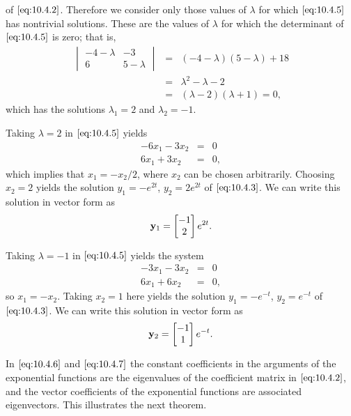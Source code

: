 \documentclass{ximera}
\begin{document}
of $\eqref{eq:10.4.2}$. Therefore we consider only those values of $\lambda$
for which $\eqref{eq:10.4.5}$ has nontrivial solutions. These are the values
of $\lambda$ for which the determinant of $\eqref{eq:10.4.5}$ is zero;   that
is,
\begin{eqnarray*}
\begin{vmatrix}-4-\lambda&-3\\6&5-\lambda\end{vmatrix}&=&
(-4-\lambda)(5-\lambda)+18\\&=&\lambda^2-\lambda-2\\
&=&(\lambda-2)(\lambda+1)=0,
\end{eqnarray*}
which has the solutions $\lambda_1=2$ and $\lambda_2=-1$.

Taking $\lambda=2$ in  $\eqref{eq:10.4.5}$ yields
\begin{eqnarray*}
-6 x_1-3 x_2&=&0\\
6 x_1+3 x_2&=&0,
\end{eqnarray*}
which implies that $x_1=-x_2/2$, where  $x_2$ can be
chosen arbitrarily. Choosing
$x_2=2$ yields the solution $y_1=-e^{2t}$,
$y_2=2e^{2t}$ of  $\eqref{eq:10.4.3}$. We can write this solution in vector
form as
\begin{equation}\label{eq:10.4.6}
{\bf y}_1=\begin{bmatrix} -1\\2\end{bmatrix} e^{2t}.
\end{equation}

Taking $\lambda=-1$ in  $\eqref{eq:10.4.5}$ yields the system
\begin{eqnarray*}
-3 x_1-3 x_2&=&0\\
6 x_1+6 x_2&=&0,
\end{eqnarray*}
so $x_1=-x_2$. Taking $x_2=1$ here
yields the solution $y_1=-e^{-t}$, $y_2=e^{-t}$ of  $\eqref{eq:10.4.3}$. We
can write this solution in vector form as
\begin{equation}\label{eq:10.4.7}
{\bf y}_2=\begin{bmatrix}-1\\1\end{bmatrix}e^{-t}.
\end{equation}

In $\eqref{eq:10.4.6}$ and $\eqref{eq:10.4.7}$ the constant coefficients in the
arguments of the exponential functions are the eigenvalues of the
coefficient matrix in $\eqref{eq:10.4.2}$, and the vector coefficients of the
exponential functions are associated eigenvectors. This illustrates
the next theorem.
\end{document}
